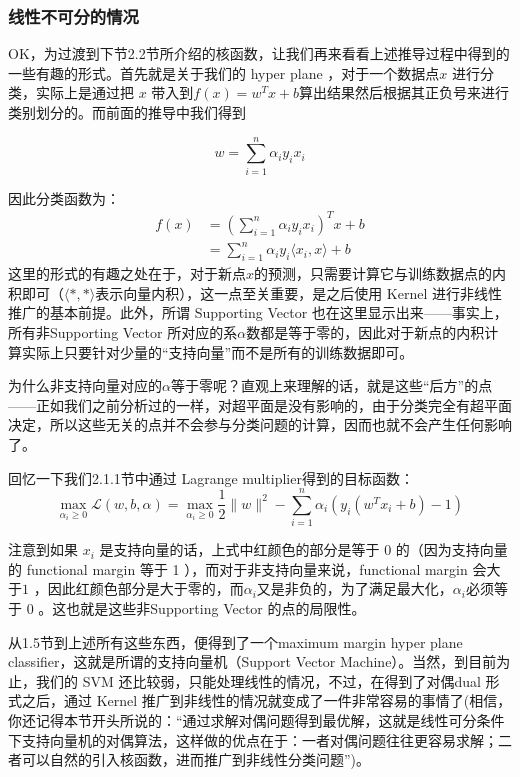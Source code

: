 \documentclass[a4paper,12pt]{article}
\begin{document}
\subsubsection{线性不可分的情况}
OK，为过渡到下节2.2节所介绍的核函数，让我们再来看看上述推导过程中得到的一些有趣的形式。首先就是关于我们的 hyper plane ，对于一个数据点$ x$ 进行分类，实际上是通过把 $x$ 带入到$f(x)=w^Tx+b$算出结果然后根据其正负号来进行类别划分的。而前面的推导中我们得到 

\begin{equation}
  w=\sum_{i=1}^n\alpha_iy_ix_i
\end{equation}

因此分类函数为：
\begin{equation}
  \begin{split}
    f(x)&=\left(\sum_{i=1}^n\alpha_iy_ix_i\right)^Tx+b\\
    &=\sum_{i=1}^n\alpha_iy_i\langle x_i,x\rangle+b
    \end{split}
  \end{equation}
这里的形式的有趣之处在于，对于新点$ x$的预测，只需要计算它与训练数据点的内积即可（$\langle*,*\rangle$表示向量内积），这一点至关重要，是之后使用 Kernel 进行非线性推广的基本前提。此外，所谓 Supporting Vector 也在这里显示出来——事实上，所有非Supporting Vector 所对应的系$\alpha$数都是等于零的，因此对于新点的内积计算实际上只要针对少量的“支持向量”而不是所有的训练数据即可。

为什么非支持向量对应的$\alpha$等于零呢？直观上来理解的话，就是这些“后方”的点——正如我们之前分析过的一样，对超平面是没有影响的，由于分类完全有超平面决定，所以这些无关的点并不会参与分类问题的计算，因而也就不会产生任何影响了。

回忆一下我们2.1.1节中通过 Lagrange multiplier得到的目标函数：
\begin{equation}
  \max_{\alpha_i\geq0}\mathcal{L}(w,b,\alpha)=\max_{\alpha_i\geq0}\frac{1}{2}\|w\|^2-\sum_{i=1}^n\alpha_i\left(y_i(w^Tx_i+b)-1\right)
\end{equation}

注意到如果 $x_i$ 是支持向量的话，上式中红颜色的部分是等于 $0$ 的（因为支持向量的 functional margin 等于 1 ），而对于非支持向量来说，functional margin 会大于$ 1$ ，因此红颜色部分是大于零的，而$\alpha_i$又是非负的，为了满足最大化，$\alpha_i$必须等于 $0$ 。这也就是这些非Supporting Vector 的点的局限性。 

从1.5节到上述所有这些东西，便得到了一个maximum margin hyper plane classifier，这就是所谓的支持向量机（Support Vector Machine）。当然，到目前为止，我们的 SVM 还比较弱，只能处理线性的情况，不过，在得到了对偶dual 形式之后，通过 Kernel 推广到非线性的情况就变成了一件非常容易的事情了(相信，你还记得本节开头所说的：“通过求解对偶问题得到最优解，这就是线性可分条件下支持向量机的对偶算法，这样做的优点在于：一者对偶问题往往更容易求解；二者可以自然的引入核函数，进而推广到非线性分类问题”)。
\end{document}
